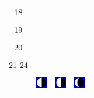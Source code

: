 \documentclass[a4paper,12pt, tikz]{scrartcl}
\begin{document}
\begin{tabularx}{\linewidth}{|c|X|X|X|}
      18&   &       &    \\
        &   &       &    \\
      \hline
      19&   &       &    \\
        &   &       &    \\
      \hline
      20&   &       &    \\
        &   &       &    \\
      \hline
      21-24&   &       &    \\
        &   &       &    \\
      \hline  
      & \vspace{0.01cm} \centerline{\includegraphics[width=0.5cm]{moon_phases/Moon_phase_6.svg.png}} \vspace{0.1cm} & \vspace{0.01cm} \centerline{\includegraphics[width=0.5cm]{moon_phases/Moon_phase_6.svg.png}} \vspace{0.1cm} & \vspace{0.01cm} \centerline{\includegraphics[width=0.5cm]{moon_phases/Moon_phase_7.svg.png}} \vspace{0.1cm}\\
      \hline   
    \end{tabularx}




    \newpage

        \noindent
\end{document}
